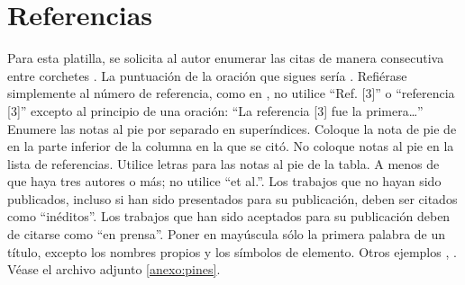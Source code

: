     \section*{Referencias}
    
    Para esta platilla, se solicita al autor enumerar las citas de manera consecutiva entre corchetes \cite{YLi2013}. 
    La puntuación de la oración que sigues sería \cite{Mesaelides2011}. 
    Refiérase simplemente al número de referencia, como en \cite{Morales2012}, no utilice “Ref. [3]” o “referencia [3]” excepto al principio de una oración: “La referencia [3] fue la primera…”
    Enumere las notas al pie por separado en superíndices. Coloque la nota de pie de en la parte inferior de la columna en la que se citó. No coloque notas al pie en la lista de referencias. Utilice letras para las notas al pie de la tabla.
    A menos de que haya tres autores o más; no utilice “et al.”. Los trabajos que no hayan sido publicados, incluso si han sido presentados para su publicación, deben ser citados como “inéditos”. Los trabajos que han sido aceptados para su publicación deben de citarse como “en prensa”. Poner en mayúscula sólo la primera palabra de un título, excepto los nombres propios y los símbolos de elemento. 
    Otros ejemplos \cite{LAAngeles2021}, \cite{LAAngelesConni}. 
    Véase el archivo adjunto \ref{anexo:pines}.
    
    
    
    
    
